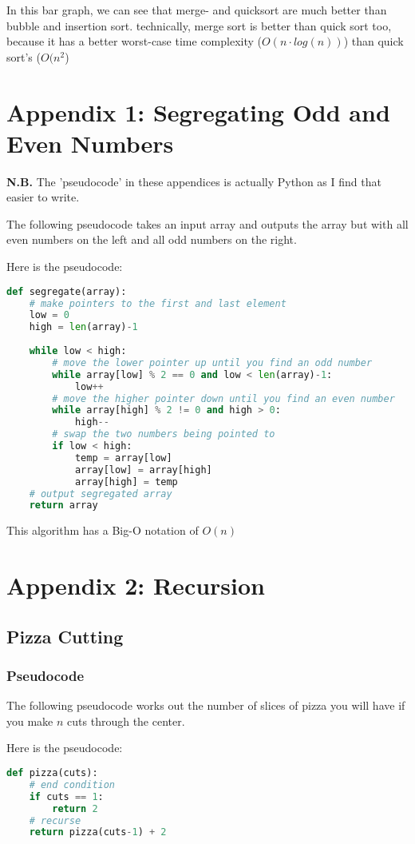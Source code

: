 \documentclass{report}
\begin{document}
In this bar graph, we can see that merge- and quicksort are much better than bubble and insertion sort. technically, merge sort is better than quick sort too, because it has a better worst-case time complexity ($O(n\cdot log(n))$) than quick sort's ($O(n^2$)

\chapter*{Appendix 1: Segregating Odd and Even Numbers}
\textbf{N.B.} The 'pseudocode' in these appendices is actually Python as I find that easier to write.

The following pseudocode takes an input array and outputs the array but with all even numbers on the left and all odd numbers on the right.

Here is the pseudocode:
\begin{lstlisting}[language=Python]
def segregate(array):
    # make pointers to the first and last element
    low = 0
    high = len(array)-1
    
    while low < high:
        # move the lower pointer up until you find an odd number
        while array[low] % 2 == 0 and low < len(array)-1:
            low++
        # move the higher pointer down until you find an even number
        while array[high] % 2 != 0 and high > 0:
            high--
        # swap the two numbers being pointed to
        if low < high:
            temp = array[low]
            array[low] = array[high]
            array[high] = temp
    # output segregated array
    return array
\end{lstlisting}
This algorithm has a Big-O notation of $O(n)$

\chapter*{Appendix 2: Recursion}
\section*{Pizza Cutting}
\subsection*{Pseudocode}
The following pseudocode works out the number of slices of pizza you will have if you make $n$ cuts through the center.

Here is the pseudocode:
\begin{lstlisting}[language=Python]
def pizza(cuts):
    # end condition
    if cuts == 1:
        return 2
    # recurse
    return pizza(cuts-1) + 2
\end{lstlisting}
\end{document}
